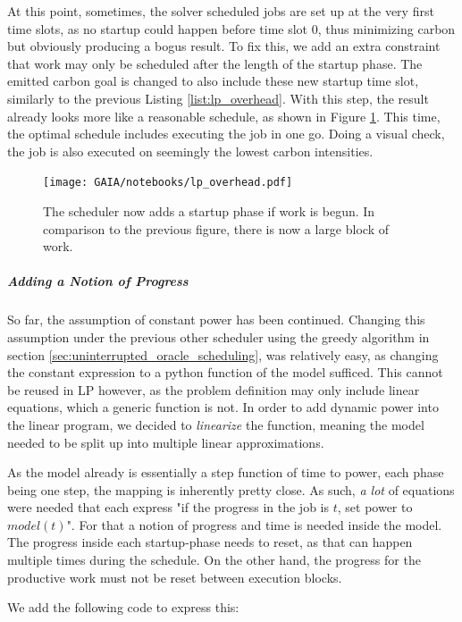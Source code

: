 At this point, sometimes, the solver scheduled jobs are set up at the very first time slots, as no startup could happen before time slot $0$, thus minimizing carbon but obviously producing a bogus result.
To fix this, we add an extra constraint that work may only be scheduled after the length of the startup phase.
The emitted carbon goal is changed to also include these new startup time slot, similarly to the previous Listing \ref{list:lp_overhead}.
With this step, the result already looks more like a reasonable schedule, as shown in Figure \ref{fig:lp_overhead}. 
This time, the optimal schedule includes executing the job in one go.
Doing a visual check, the job is also executed on seemingly the lowest carbon intensities.

\begin{figure}
    \texttt{[image: GAIA/notebooks/lp\_overhead.pdf]}
    \caption{The scheduler now adds a startup phase if work is begun. In comparison to the previous figure, there is now a large block of work.}
    \label{fig:lp_overhead}
\end{figure}

\subparagraph{Adding a Notion of Progress}

So far, the assumption of constant power has been continued.
Changing this assumption under the previous other scheduler using the greedy algorithm in section \ref{sec:uninterrupted_oracle_scheduling}, was relatively easy, as changing the constant expression to a python function of the model sufficed. 
This cannot be reused in LP however, as the problem definition may only include linear equations, which a generic function is not. 
In order to add dynamic power into the linear program, we decided to \emph{linearize} the function, meaning the model needed to be split up into multiple linear approximations.

As the model already is essentially a step function of time to power, each phase being one step, the mapping is inherently pretty close. 
As such, \emph{a lot} of equations were needed that each express "if the progress in the job is $t$, set power to $model(t)$". 
For that a notion of progress and time is needed inside the model.
The progress inside each startup-phase needs to reset, as that can happen multiple times during the schedule. 
On the other hand, the progress for the productive work must not be reset between execution blocks. 

We add the following code to express this:

